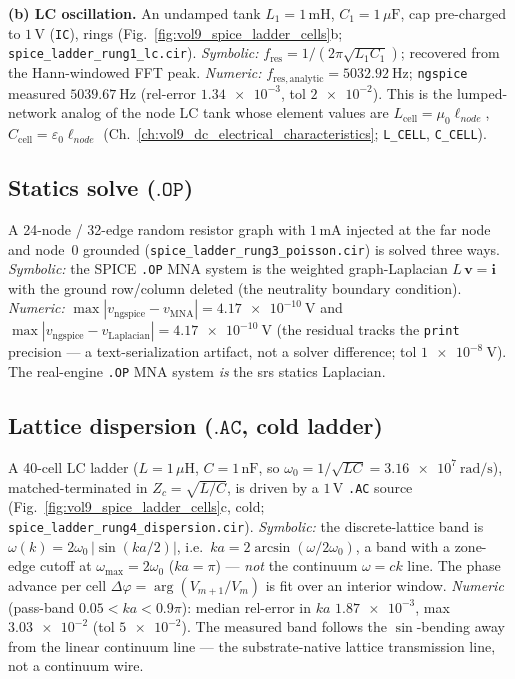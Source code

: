 \textbf{(b) LC oscillation.} An undamped tank $L_1 = 1\,\mathrm{mH}$, $C_1 = 1\,\mu\mathrm{F}$, cap pre-charged to $1\,\mathrm{V}$ (\texttt{IC}), rings (Fig.~\ref{fig:vol9_spice_ladder_cells}b; \texttt{spice\_ladder\_rung1\_lc.cir}). \emph{Symbolic:} $f_{\mathrm{res}} = 1/(2\pi\sqrt{L_1 C_1})$; recovered from the Hann-windowed FFT peak. \emph{Numeric:} $f_{\mathrm{res,analytic}} = \qty{5032.92}{\hertz}$; \texttt{ngspice} measured $\qty{5039.67}{\hertz}$ (rel-error $\num{1.34e-3}$, tol $\num{2e-2}$). This is the lumped-network analog of the node LC tank whose element values are $L_{\mathrm{cell}} = \mu_0\ell_{node}$, $C_{\mathrm{cell}} = \varepsilon_0\ell_{node}$ (Ch.~\ref{ch:vol9_dc_electrical_characteristics};  \texttt{L\_CELL}, \texttt{C\_CELL}).

\subsection{Statics solve ($\mathtt{.OP}$)}
\label{subsec:vol9_app_spice_op}

A 24-node / 32-edge random resistor graph with $1\,\mathrm{mA}$ injected at the far node and node~0 grounded (\texttt{spice\_ladder\_rung3\_poisson.cir}) is solved three ways. \emph{Symbolic:} the SPICE \texttt{.OP} MNA system is the weighted graph-Laplacian $L\,\mathbf{v} = \mathbf{i}$ with the ground row/column deleted (the neutrality boundary condition). \emph{Numeric:} $\max|v_{\mathrm{ngspice}} - v_{\mathrm{MNA}}| = \qty{4.17e-10}{\volt}$ and $\max|v_{\mathrm{ngspice}} - v_{\mathrm{Laplacian}}| = \qty{4.17e-10}{\volt}$ (the residual tracks the \texttt{print} precision --- a text-serialization artifact, not a solver difference; tol $\qty{1e-8}{\volt}$). The real-engine \texttt{.OP} MNA system \emph{is} the srs statics Laplacian.

\subsection{Lattice dispersion ($\mathtt{.AC}$, cold ladder)}
\label{subsec:vol9_app_spice_ac_dispersion}

A 40-cell LC ladder ($L = 1\,\mu\mathrm{H}$, $C = 1\,\mathrm{nF}$, so $\omega_0 = 1/\sqrt{LC} = \qty{3.16e7}{\radian\per\second}$), matched-terminated in $Z_c = \sqrt{L/C}$, is driven by a $1\,\mathrm{V}$ \texttt{.AC} source (Fig.~\ref{fig:vol9_spice_ladder_cells}c, cold; \texttt{spice\_ladder\_rung4\_dispersion.cir}). \emph{Symbolic:} the discrete-lattice band is $\omega(k) = 2\omega_0\,|\sin(ka/2)|$, i.e.\ $ka = 2\arcsin(\omega/2\omega_0)$, a band with a zone-edge cutoff at $\omega_{\max} = 2\omega_0$ ($ka = \pi$) --- \emph{not} the continuum $\omega = ck$ line. The phase advance per cell $\Delta\varphi = \arg(V_{m+1}/V_m)$ is fit over an interior window. \emph{Numeric} (pass-band $0.05 < ka < 0.9\pi$): median rel-error in $ka$ $\num{1.87e-3}$, max $\num{3.03e-2}$ (tol $\num{5e-2}$). The measured band follows the $\sin$-bending away from the linear continuum line --- the substrate-native lattice transmission line, not a continuum wire.

